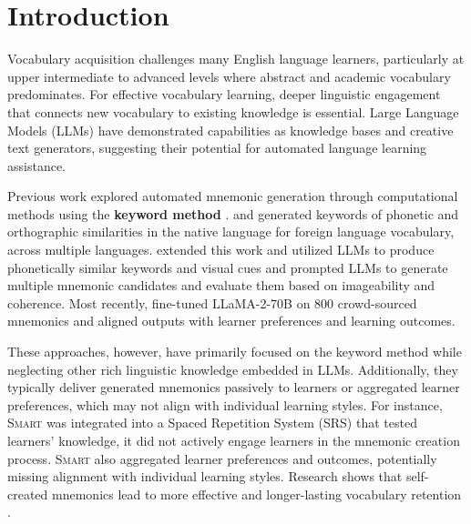 \section{Introduction} \label{sec:intro}


Vocabulary acquisition challenges many English language learners, particularly at upper intermediate to advanced levels where abstract and academic vocabulary predominates. For effective vocabulary learning, deeper linguistic engagement that connects new vocabulary to existing knowledge is essential. Large Language Models (LLMs) have demonstrated capabilities as knowledge bases and creative text generators, suggesting their potential for automated language learning assistance.

Previous work explored automated mnemonic generation through computational methods using the \textbf{keyword method} \citep{atkinsonApplicationMnemonicKeyword1975}. \citet{savvaTransPhonerAutomatedMnemonic2014} and \citet{OzbalAUTOMATION2014} generated keywords of phonetic and orthographic similarities in the native language for foreign language vocabulary, across multiple languages. \citet{LeeSMARTPHONE2023} extended this work and utilized LLMs to produce phonetically similar keywords and visual cues and \citet{LeeEXPLORING2024} prompted LLMs to generate multiple mnemonic candidates and evaluate them based on imageability and coherence. Most recently, \citet{BalepurSMART2024} fine-tuned LLaMA-2-70B on 800 crowd-sourced mnemonics and aligned outputs with learner preferences and learning outcomes.

These approaches, however, have primarily focused on the keyword method while neglecting other rich linguistic knowledge embedded in LLMs. Additionally, they typically deliver generated mnemonics passively to learners or aggregated learner preferences, which may not align with individual learning styles. For instance, \textsc{Smart} \citep{BalepurSMART2024} was integrated into a Spaced Repetition System (SRS) that tested learners' knowledge, it did not actively engage learners in the mnemonic creation process. \textsc{Smart} also aggregated learner preferences and outcomes, potentially missing alignment with individual learning styles. Research shows that self-created mnemonics lead to more effective and longer-lasting vocabulary retention \citep{madanExploringWordMemorability2021}.

